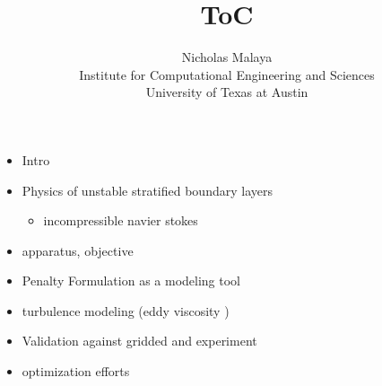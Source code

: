 \documentclass{article}
\title{\bf{ToC}}
\author{Nicholas Malaya \\ Institute for Computational Engineering and Sciences \\ University of Texas at Austin} \date{}
\begin{document}
\maketitle

\newpage

\begin{itemize}
  \item Intro
  \item Physics of unstable stratified boundary layers
\begin{itemize}
	\item incompressible navier stokes
\end{itemize}
  \item apparatus, objective
  \item Penalty Formulation as a modeling tool
  \item turbulence modeling (eddy viscosity )
  \item Validation against gridded and experiment
  \item optimization efforts
\end{itemize}
\end{document}
